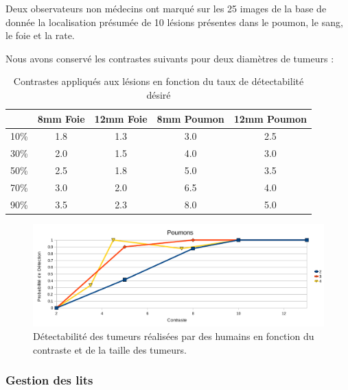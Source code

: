 Deux observateurs non médecins ont marqué sur les 25 images de la base de donnée la localisation présumée de 10 lésions présentes dans le poumon, le sang, le foie et la rate.

Nous avons conservé les contrastes suivants pour deux diamètres de tumeurs :



\begin{table}

\centering

\begin{tabular}{|c||c|c||c|c|}
 \hline
	& 8mm Foie	& 12mm Foie	& 8mm Poumon	& 12mm Poumon	\\
\hline
10\%	& 1.8		& 1.3		& 3.0		& 2.5		\\
\hline
30\%	& 2.0		& 1.5		& 4.0		& 3.0		\\
\hline
50\%	& 2.5		& 1.8		& 5.0		& 3.5		\\
\hline
70\%	& 3.0		& 2.0		& 6.5		& 4.0		\\
\hline
90\%	& 3.5		& 2.3		& 8.0		& 5.0		\\
\hline
\end{tabular}
\caption[Contraste final lésions du foie]{Contrastes appliqués aux lésions en fonction du taux de détectabilité désiré}
\label{tab:contrasteFoieOrig}
\end{table}



\begin{figure}[h!]
\begin{center}
\includegraphics[width=15cm]{images/calibration}
\end{center}
\caption{Détectabilité des tumeurs réalisées par des humains en fonction du contraste et de la taille des tumeurs.} 
\label{fig:calibration}
\end{figure}


\subsubsection{Gestion des lits}

